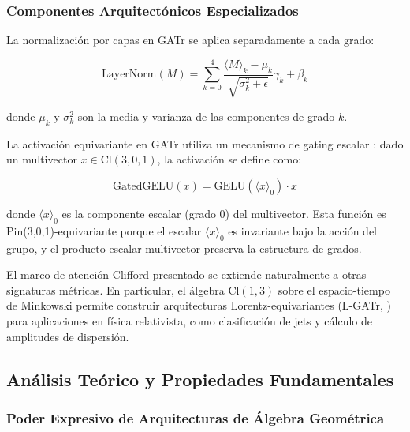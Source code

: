 \subsubsection{Componentes Arquitectónicos Especializados}

\begin{definition}\label{def:normalizacion_grado}
La normalización por capas en GATr se aplica separadamente a cada grado:

\begin{equation}
    \text{LayerNorm}(M) = \sum_{k=0}^4 \frac{\langle M \rangle_k - \mu_k}{\sqrt{\sigma_k^2 + \epsilon}} \gamma_k + \beta_k
\end{equation}

donde $\mu_k$ y $\sigma_k^2$ son la media y varianza de las componentes de grado $k$.
\end{definition}

\begin{definition}\label{def:activacion_equivariante_gatr}
La activación equivariante en GATr utiliza un mecanismo de gating escalar \citep{brehmer2023geometric}: dado un multivector $x \in \text{Cl}(3,0,1)$, la activación se define como:

\begin{equation}
    \text{GatedGELU}(x) = \text{GELU}(\langle x \rangle_0) \cdot x
\end{equation}

donde $\langle x \rangle_0$ es la componente escalar (grado 0) del multivector. Esta función es Pin(3,0,1)-equivariante porque el escalar $\langle x \rangle_0$ es invariante bajo la acción del grupo, y el producto escalar-multivector preserva la estructura de grados.
\end{definition}

El marco de atención Clifford presentado se extiende naturalmente a otras signaturas métricas. En particular, el álgebra $\text{Cl}(1,3)$ sobre el espacio-tiempo de Minkowski permite construir arquitecturas Lorentz-equivariantes (L-GATr, \citet{spinner2024lgatr}) para aplicaciones en física relativista, como clasificación de jets y cálculo de amplitudes de dispersión.

\subsection{Análisis Teórico y Propiedades Fundamentales}

\subsubsection{Poder Expresivo de Arquitecturas de Álgebra Geométrica}

